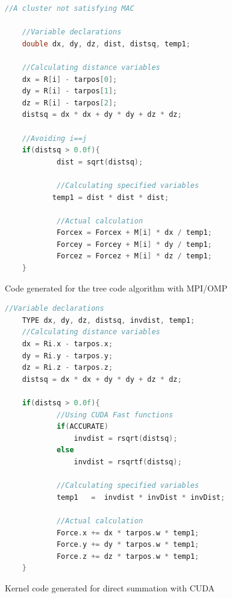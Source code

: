 \documentclass[draftclsnofoot]{elsarticle}
\begin{document}
  
\begin{figure}[!t]
\centering
\begin{lstlisting}[style=AMMA, language=C]
	//A cluster not satisfying MAC
	
	//Variable declarations
	double dx, dy, dz, dist, distsq, temp1;

	//Calculating distance variables
	dx = R[i] - tarpos[0];
	dy = R[i] - tarpos[1];
	dz = R[i] - tarpos[2];
	distsq = dx * dx + dy * dy + dz * dz;

	//Avoiding i==j 
	if(distsq > 0.0f){
            dist = sqrt(distsq);

            //Calculating specified variables
           temp1 = dist * dist * dist;
           
            //Actual calculation
            Forcex = Forcex + M[i] * dx / temp1;
            Forcey = Forcey + M[i] * dy / temp1;
            Forcez = Forcez + M[i] * dz / temp1;
	}
\end{lstlisting}
\caption{Code generated for the tree code algorithm with MPI/OMP}
\label{fig_first_case}
\end{figure}

\begin{figure}[!t]
\centering
\begin{lstlisting}[style=AMMA, language=C]
	//Variable declarations
	TYPE dx, dy, dz, distsq, invdist, temp1;
	//Calculating distance variables
	dx = Ri.x - tarpos.x;
	dy = Ri.y - tarpos.y;
	dz = Ri.z - tarpos.z;
	distsq = dx * dx + dy * dy + dz * dz;

	if(distsq > 0.0f){
            //Using CUDA Fast functions
            if(ACCURATE)
                invdist = rsqrt(distsq);
            else
                invdist = rsqrtf(distsq);
           
            //Calculating specified variables
            temp1   =  invdist * invDist * invDist;
          
            //Actual calculation
            Force.x += dx * tarpos.w * temp1;
            Force.y += dy * tarpos.w * temp1;
            Force.z += dz * tarpos.w * temp1;
	}
\end{lstlisting}
\caption{Kernel code generated for direct summation with CUDA}
\label{fig_second_case}
\end{figure}
\end{document}
